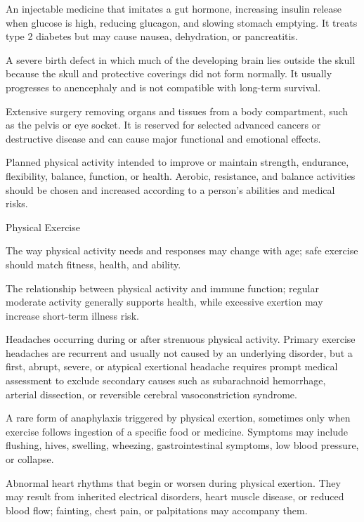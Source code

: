  An injectable medicine that imitates a gut hormone, increasing insulin release when glucose is high, reducing glucagon, and slowing stomach emptying. It treats type 2 diabetes but may cause nausea, dehydration, or pancreatitis.

 A severe birth defect in which much of the developing brain lies outside the skull because the skull and protective coverings did not form normally. It usually progresses to anencephaly and is not compatible with long-term survival.

 Extensive surgery removing organs and tissues from a body compartment, such as the pelvis or eye socket. It is reserved for selected advanced cancers or destructive disease and can cause major functional and emotional effects.

 Planned physical activity intended to improve or maintain strength, endurance, flexibility, balance, function, or health. Aerobic, resistance, and balance activities should be chosen and increased according to a person’s abilities and medical risks.

\synonyms
Physical Exercise

 The way physical activity needs and responses may change with age; safe exercise should match fitness, health, and ability.

 The relationship between physical activity and immune function; regular moderate activity generally supports health, while excessive exertion may increase short-term illness risk.

 Headaches occurring during or after strenuous physical activity. Primary exercise headaches are recurrent and usually not caused by an underlying disorder, but a first, abrupt, severe, or atypical exertional headache requires prompt medical assessment to exclude secondary causes such as subarachnoid hemorrhage, arterial dissection, or reversible cerebral vasoconstriction syndrome.

 A rare form of anaphylaxis triggered by physical exertion, sometimes only when exercise follows ingestion of a specific food or medicine. Symptoms may include flushing, hives, swelling, wheezing, gastrointestinal symptoms, low blood pressure, or collapse.

 Abnormal heart rhythms that begin or worsen during physical exertion. They may result from inherited electrical disorders, heart muscle disease, or reduced blood flow; fainting, chest pain, or palpitations may accompany them.

